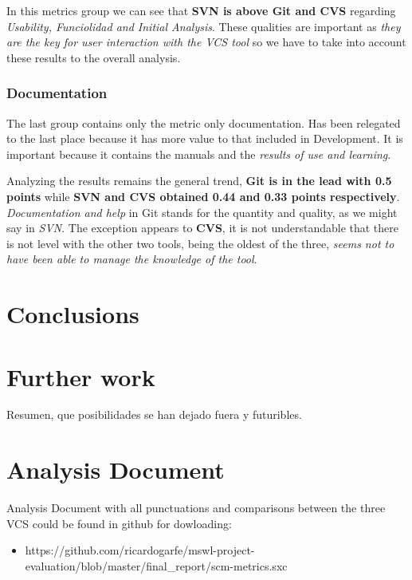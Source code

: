 \documentclass[11pt]{scrartcl}
\begin{document}
\par In this metrics group we can see that \textbf{SVN is above Git and CVS} regarding \emph{Usability, Funciolidad and Initial Analysis}. These qualities are important as \emph{they are the key for user interaction with the VCS tool} so we have to take into account these results to the overall analysis.

\subsubsection{Documentation}

\par The last group contains only the metric only documentation. Has been relegated to the last place because it has more value to that included in Development. It is important because it contains the manuals and the \emph{results of use and learning}.

\par Analyzing the results remains the general trend, \textbf{Git is in the lead with 0.5 points} while \textbf{SVN and CVS obtained 0.44 and 0.33 points respectively}. \emph{Documentation and help} in Git stands for the quantity and quality, as we might say in \emph{SVN}. The exception appears to \textbf{CVS}, it is not understandable that there is not level with the other two tools, being the oldest of the three, \emph{seems not to have been able to manage the knowledge of the tool}.

\section{Conclusions}

\section{Further work}

Resumen, que posibilidades se han dejado fuera y futuribles.

\section{Analysis Document}

Analysis Document with all punctuations and comparisons between the three VCS could be found in github for dowloading:
\begin{itemize}
    \item https://github.com/ricardogarfe/mswl-project-evaluation/blob/master/final\_report/scm-metrics.sxc
\end{itemize}
\end{document}
